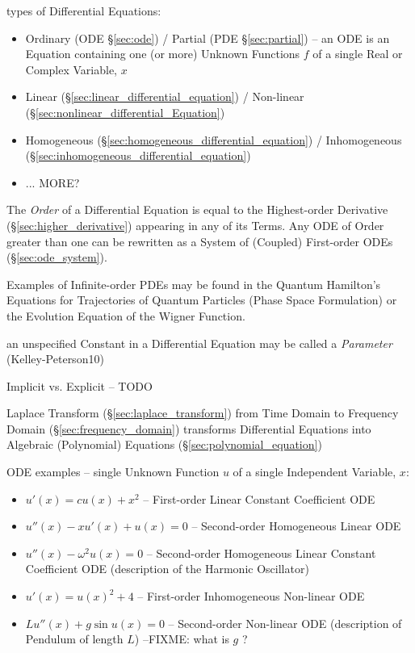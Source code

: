 types of Differential Equations:
\begin{itemize}
  \item Ordinary (ODE \S\ref{sec:ode}) / Partial (PDE \S\ref{sec:partial}) --
    an ODE is an Equation containing one (or more) Unknown Functions $f$ of a
    single Real or Complex Variable, $x$
  \item Linear (\S\ref{sec:linear_differential_equation}) /
    Non-linear (\S\ref{sec:nonlinear_differential_Equation})
  \item Homogeneous (\S\ref{sec:homogeneous_differential_equation}) /
    Inhomogeneous (\S\ref{sec:inhomogeneous_differential_equation})
  \item ... MORE?
\end{itemize}

The \emph{Order} of a Differential Equation is equal to the Highest-order
Derivative (\S\ref{sec:higher_derivative}) appearing in any of its Terms. Any
ODE of Order greater than one can be rewritten as a System of (Coupled)
First-order ODEs (\S\ref{sec:ode_system}).

Examples of Infinite-order PDEs may be found in the Quantum Hamilton's Equations
for Trajectories of Quantum Particles (Phase Space Formulation) or the Evolution
Equation of the Wigner Function.

an unspecified Constant in a Differential Equation may be called a
\emph{Parameter} (Kelley-Peterson10)

Implicit vs. Explicit -- TODO

\fist Laplace Transform (\S\ref{sec:laplace_transform}) from Time Domain to
Frequency Domain (\S\ref{sec:frequency_domain}) transforms Differential
Equations into Algebraic (Polynomial) Equations
(\S\ref{sec:polynomial_equation})

ODE examples -- single Unknown Function $u$ of a single Independent Variable,
$x$:
\begin{itemize}
\item $u'(x) = cu(x) + x^2$ -- First-order Linear Constant Coefficient ODE
\item $u''(x) - xu'(x) + u(x) = 0$ -- Second-order Homogeneous Linear ODE
\item $u''(x) - \omega^2u(x) = 0$ -- Second-order Homogeneous Linear Constant
  Coefficient ODE (description of the Harmonic Oscillator)
\item $u'(x) = u(x)^2 + 4$ -- First-order Inhomogeneous Non-linear ODE
\item $Lu''(x) + g\sin{u(x)} = 0$ -- Second-order Non-linear ODE (description of
  Pendulum of length $L$) --FIXME: what is $g$ ?
\end{itemize}

